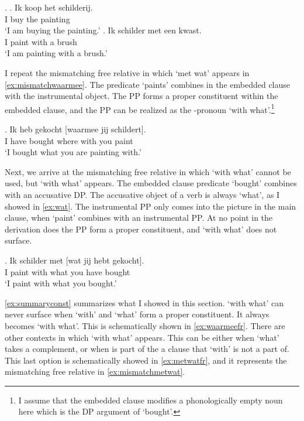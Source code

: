 \documentclass[12pt]{article}
\begin{document}
\ex.
\ag. Ik koop het schilderij.\\
 I buy the painting\\
 `I am buying the painting.'\label{ex:kopen}
\bg. Ik schilder met een kwast.\\
 I paint with a brush\\
 `I am painting with a brush.'\label{ex:schilderen}

I repeat the mismatching free relative in which  `met wat' appears in \ref{ex:mismatchwaarmee}. The predicate  `paints' combines in the embedded clause with the instrumental object. The PP forms a proper constituent within the embedded clause, and the PP can be realized as the -pronoun  `with what'.\footnote{I assume that the embedded clause modifies a phonologically empty noun here which is the DP argument of  `bought'.}

\exg. Ik heb gekocht [waarmee jij schildert].\\
 I have bought {where with} you paint\\
 `I bought what you are painting with.'\label{ex:mismatchwaarmee}

Next, we arrive at the mismatching free relative in which  `with what' cannot be used, but  `with what' appears. The embedded clause predicate  `bought' combines with an accusative DP. The accusative object of a verb is always  `what', as I showed in \ref{ex:wat}. The instrumental PP only comes into the picture in the main clause, when  `paint' combines with an instrumental PP. At no point in the derivation does the PP form a proper constituent, and  `with what' does not surface.

\exg. Ik schilder met [wat jij hebt gekocht].\\
 I paint with what you have bought\\
 `I paint with what you bought.'\label{ex:mismatchmetwat}

\ref{ex:summaryconst} summarizes what I showed in this section.  `with what' can never surface when  `with' and  `what' form a proper constituent. It always becomes  `with what'. This is schematically shown in \ref{ex:waarmeefr}.
There are other contexts in which  `with what' appears. This can be either when  `what' takes a complement, or when  is part of the a clause that  `with' is not a part of. This last option is schematically showed in \ref{ex:metwatfr}, and it represents the mismatching free relative in \ref{ex:mismatchmetwat}.
\end{document}
